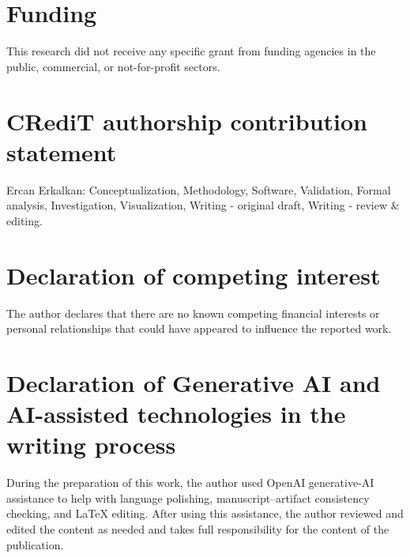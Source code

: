 \documentclass[preprint,12pt]{elsarticle}
\begin{document}
\section*{Funding}
This research did not receive any specific grant from funding agencies in the public, commercial, or not-for-profit sectors.

\section*{CRediT authorship contribution statement}
Ercan Erkalkan: Conceptualization, Methodology, Software, Validation, Formal analysis, Investigation, Visualization, Writing - original draft, Writing - review \& editing.

\section*{Declaration of competing interest}
The author declares that there are no known competing financial interests or personal relationships that could have appeared to influence the reported work.

\section*{Declaration of Generative AI and AI-assisted technologies in the writing process}
During the preparation of this work, the author used OpenAI generative-AI assistance to help with language polishing, manuscript--artifact consistency checking, and LaTeX editing. After using this assistance, the author reviewed and edited the content as needed and takes full responsibility for the content of the publication.

\FloatBarrier
\clearpage


\end{document}
